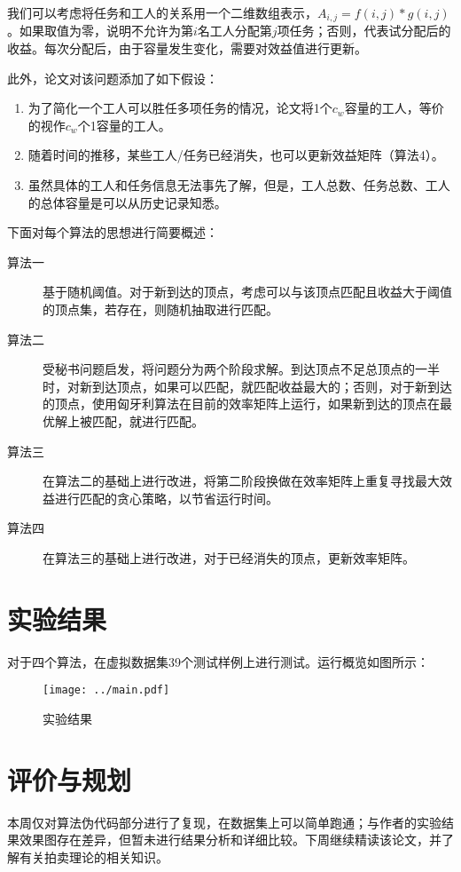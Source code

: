 \documentclass[a4paper,12pt]{ctexart}
\begin{document}
我们可以考虑将任务和工人的关系用一个二维数组表示，$A_{i, j} = f(i, j) * g(i, j)$。如果取值为零，说明不允许为第$i$名工人分配第$j$项任务；否则，代表试分配后的收益。每次分配后，由于容量发生变化，需要对效益值进行更新。

此外，论文对该问题添加了如下假设：

\begin{enumerate}
    \item 为了简化一个工人可以胜任多项任务的情况，论文将1个$c_w$容量的工人，等价的视作$c_w$个1容量的工人。
    \item 随着时间的推移，某些工人/任务已经消失，也可以更新效益矩阵（算法4）。
    \item 虽然具体的工人和任务信息无法事先了解，但是，工人总数、任务总数、工人的总体容量是可以从历史记录知悉。
\end{enumerate}


下面对每个算法的思想进行简要概述：
\begin{description}
    \item[算法一] 基于随机阈值。对于新到达的顶点，考虑可以与该顶点匹配且收益大于阈值的顶点集，若存在，则随机抽取进行匹配。
    \item[算法二] 受秘书问题启发，将问题分为两个阶段求解。到达顶点不足总顶点的一半时，对新到达顶点，如果可以匹配，就匹配收益最大的；否则，对于新到达的顶点，使用匈牙利算法在目前的效率矩阵上运行，如果新到达的顶点在最优解上被匹配，就进行匹配。
    \item[算法三] 在算法二的基础上进行改进，将第二阶段换做在效率矩阵上重复寻找最大效益进行匹配的贪心策略，以节省运行时间。
    \item[算法四] 在算法三的基础上进行改进，对于已经消失的顶点，更新效率矩阵。  
\end{description}

\section{实验结果}

对于四个算法，在虚拟数据集39个测试样例上进行测试。运行概览如图所示：
\begin{figure}[htbp]
    \centering
    \texttt{[image: ../main.pdf]}
    \caption{实验结果}
\end{figure}

\section{评价与规划}

本周仅对算法伪代码部分进行了复现，在数据集上可以简单跑通；与作者的实验结果效果图存在差异，但暂未进行结果分析和详细比较。下周继续精读该论文，并了解有关拍卖理论的相关知识。



\end{document}
